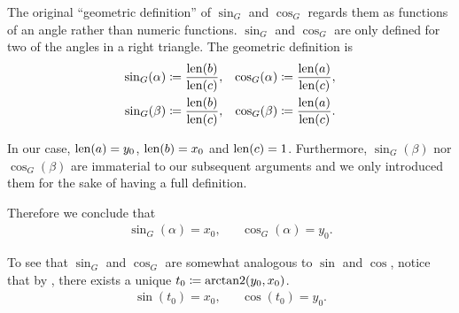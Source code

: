 \begin{definition}
  The original \enquote{geometric definition} of \( \sin_G \) and \( \cos_G \) regards them as functions of an angle rather than numeric functions. \( \sin_G \) and \( \cos_G \) are only defined for two of the angles in a right triangle. The geometric definition is
  \begin{align*}
    \sin_G(\alpha) \coloneqq \frac{\operatorname{len}(b)} {\operatorname{len}(c)}, && \cos_G(\alpha) \coloneqq \frac{\operatorname{len}(a)} {\operatorname{len}(c)},
    \\
    \sin_G(\beta) \coloneqq \frac{\operatorname{len}(b)} {\operatorname{len}(c)}, && \cos_G(\beta) \coloneqq \frac{\operatorname{len}(a)} {\operatorname{len}(c)}.
  \end{align*}

  In our case, \( \operatorname{len}(a) = y_0 \), \( \operatorname{len}(b) = x_0 \) and \( \operatorname{len}(c) = 1 \). Furthermore, \( \sin_G(\beta) \) nor \( \cos_G(
  \beta) \) are immaterial to our subsequent arguments and we only introduced them for the sake of having a full definition.

  Therefore we conclude that
  \begin{align*}
    \sin_G(\alpha) = x_0,
    &&
    \cos_G(\alpha) = y_0.
  \end{align*}

  To see that \( \sin_G \) and \( \cos_G \) are somewhat analogous to \( \sin \) and \( \cos \), notice that by , there exists a unique \( t_0 \coloneqq \operatorname{arctan2}(y_0, x_0) \).
  \begin{align*}
    \sin(t_0) = x_0,
    &&
    \cos(t_0) = y_0.
  \end{align*}
\end{definition}
